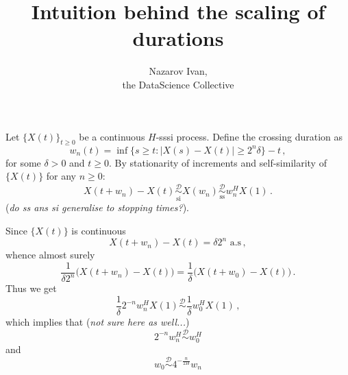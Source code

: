 \documentclass[a4paper]{article}
\title{Intuition behind the scaling of durations}
\author{Nazarov Ivan, \rus{101мНОД(ИССА)}\\the DataScience Collective}
\begin{document}
\maketitle

\noindent Let $\{X(t)\}_{t\geq0}$ be a continuous $H$-sssi process. Define the crossing
duration as
\[ w_n(t) = \inf\bigl\{ s\geq t : |X(s) - X(t)| \geq 2^n \delta  \bigr\} - t\,, \]
for some $\delta > 0$ and $t\geq 0$. By stationarity of increments and
self-similarity of $\{X(t)\}$ for any $n\geq 0$:
\[
X(t + w_n) - X(t) \underset{\text{si}}{\overset{\mathcal{D}}{\sim}}
X(w_n) \underset{\text{ss}}{\overset{\mathcal{D}}{\sim}}
w_n^H X(1) \,.
\]
(\emph{do ss ans si generalise to stopping times?}).

Since $\{X(t)\}$ is continuous
\[ X(t+w_n)-X(t) = \delta 2^n \text{ a.s}\,,\]
whence almost surely
\[ \frac{1}{\delta 2^n}\bigl( X(t+w_n)-X(t)\bigr) = \frac{1}{\delta} \bigl( X(t+w_0) - X(t) \bigr)\,.\]
Thus we get
\[ \frac{1}{\delta} 2^{-n} w_n^H X(1) \overset{\mathcal{D}}{\sim} \frac{1}{\delta} w_0^H X(1) \,, \]
which implies that (\emph{not sure here as well...})
\[ 2^{-n} w_n^H \overset{\mathcal{D}}{\sim} w_0^H \] 
and
\[ w_0 \overset{\mathcal{D}}{\sim} 4^{-\frac{n}{2H}} w_n \] 
\end{document}

